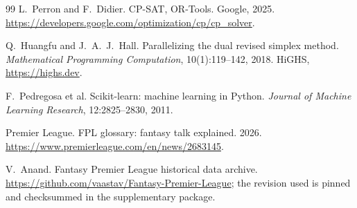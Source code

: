 \documentclass[11pt,a4paper]{article}
\begin{document}
\begin{thebibliography}{99}
 L.\ Perron and F.\ Didier. CP-SAT, OR-Tools. Google, 2025. \url{https://developers.google.com/optimization/cp/cp_solver}.

 Q.\ Huangfu and J.\ A.\ J.\ Hall. Parallelizing the dual revised simplex method. \emph{Mathematical Programming Computation}, 10(1):119--142, 2018. HiGHS, \url{https://highs.dev}.

 F.\ Pedregosa et al. Scikit-learn: machine learning in Python. \emph{Journal of Machine Learning Research}, 12:2825--2830, 2011.

 Premier League. FPL glossary: fantasy talk explained. 2026. \url{https://www.premierleague.com/en/news/2683145}.

 V.\ Anand. Fantasy Premier League historical data archive. \url{https://github.com/vaastav/Fantasy-Premier-League}; the revision used is pinned and checksummed in the supplementary package.

\end{thebibliography}
\end{document}
